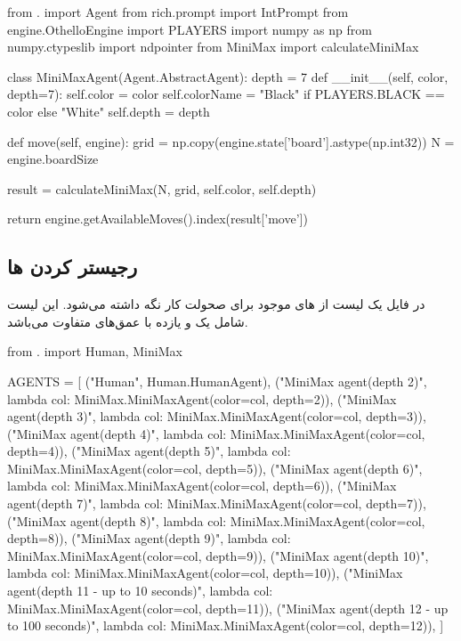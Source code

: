 \begin{latin}
\begin{python}
from . import Agent
from rich.prompt import IntPrompt
from engine.OthelloEngine import PLAYERS
import numpy as np
from numpy.ctypeslib import ndpointer
from MiniMax import calculateMiniMax

class MiniMaxAgent(Agent.AbstractAgent):
    depth = 7
    def __init__(self, color, depth=7):
        self.color = color
        self.colorName = "Black" if PLAYERS.BLACK == color else "White"
        self.depth = depth


    def move(self, engine):
        grid = np.copy(engine.state['board'].astype(np.int32))
        N = engine.boardSize

        result = calculateMiniMax(N, grid, self.color,
                self.depth)

        return engine.getAvailableMoves().index(result['move'])
        

\end{python}
\end{latin}

\subsection{رجیستر کردن ها }

در فایل
یک لیست از 
های موجود برای صحولت کار
نگه داشته می‌شود.
این لیست شامل یک
و 
یازده
با عمق‌های متفاوت می‌باشد.

\begin{latin}
\begin{python}
from . import Human, MiniMax


AGENTS = [
        ("Human", Human.HumanAgent), 
        ("MiniMax agent(depth 2)", lambda col: MiniMax.MiniMaxAgent(color=col,
            depth=2)),
        ("MiniMax agent(depth 3)", lambda col: MiniMax.MiniMaxAgent(color=col,
            depth=3)),
        ("MiniMax agent(depth 4)", lambda col: MiniMax.MiniMaxAgent(color=col,
            depth=4)),
        ("MiniMax agent(depth 5)", lambda col: MiniMax.MiniMaxAgent(color=col,
            depth=5)),
        ("MiniMax agent(depth 6)", lambda col: MiniMax.MiniMaxAgent(color=col,
            depth=6)),
        ("MiniMax agent(depth 7)", lambda col: MiniMax.MiniMaxAgent(color=col,
            depth=7)),
        ("MiniMax agent(depth 8)", lambda col: MiniMax.MiniMaxAgent(color=col,
            depth=8)),
        ("MiniMax agent(depth 9)", lambda col: MiniMax.MiniMaxAgent(color=col,
            depth=9)),
        ("MiniMax agent(depth 10)", lambda col: MiniMax.MiniMaxAgent(color=col,
            depth=10)),
        ("MiniMax agent(depth 11 - up to 10 seconds)", lambda col: MiniMax.MiniMaxAgent(color=col,
            depth=11)),
        ("MiniMax agent(depth 12 - up to 100 seconds)", lambda col: MiniMax.MiniMaxAgent(color=col,
            depth=12)),
        ]
\end{python}
\end{latin}


